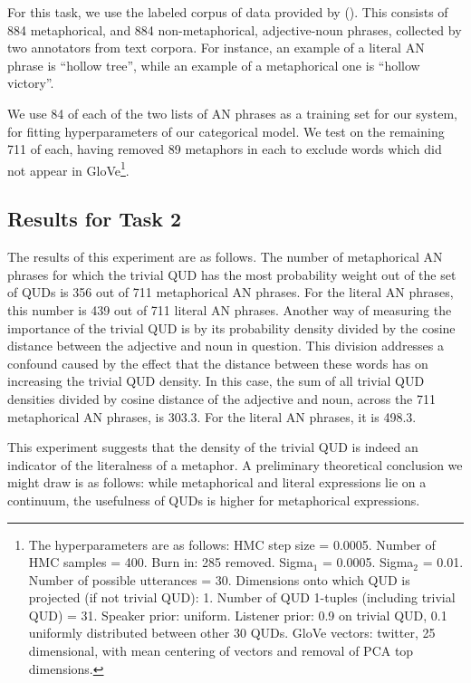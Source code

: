 \documentclass[10pt,letterpaper,twocolumn]{article}
\begin{document}
For this task, we use the labeled corpus of data provided by (\cite{tsvetkov2014metaphor}). This consists of 884 metaphorical, and 884 non-metaphorical, adjective-noun phrases, collected by two annotators from text corpora. For instance, an example of a literal AN phrase is ``hollow tree'', while an example of a metaphorical one is ``hollow victory''.

We use 84 of each of the two lists of AN phrases as a training set for our system, for fitting hyperparameters of our categorical model. We test on the remaining 711 of each, having removed 89 metaphors in each to exclude words which did not appear in GloVe\footnote{The hyperparameters are as follows: HMC step size = 0.0005. Number of HMC samples = 400. Burn in: 285 removed. Sigma$_1$ = 0.0005. Sigma$_2$ = 0.01. Number of possible utterances = 30. Dimensions onto which QUD is projected (if not trivial QUD): 1. Number of QUD 1-tuples (including trivial QUD) = 31. Speaker prior: uniform. Listener prior: 0.9 on trivial QUD, 0.1 uniformly distributed between other 30 QUDs. GloVe vectors: twitter, 25 dimensional, with mean centering of vectors and removal of PCA top dimensions.}.

\subsection{Results for Task 2}

The results of this experiment are as follows. The number of metaphorical AN phrases for which the trivial QUD has the most probability weight out of the set of QUDs is 356 out of 711 metaphorical AN phrases. For the literal AN phrases, this number is 439 out of 711 literal AN phrases. Another way of measuring the importance of the trivial QUD is by its probability density divided by the cosine distance between the adjective and noun in question. This division addresses a confound caused by the effect that the distance between these words has on increasing the trivial QUD density. In this case, the sum of all trivial QUD densities divided by cosine distance of the adjective and noun, across the 711 metaphorical AN phrases, is  303.3. For the literal AN phrases, it is 498.3.

This experiment suggests that the density of the trivial QUD is indeed an indicator of the literalness of a metaphor. A preliminary theoretical conclusion we might draw is as follows: while metaphorical and literal expressions lie on a continuum, the usefulness of QUDs is higher for metaphorical expressions.
\end{document}
